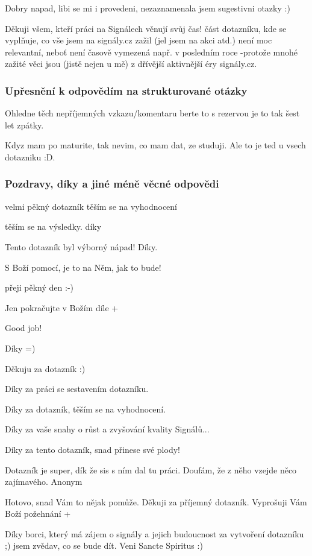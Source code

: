 Dobry napad, libi se mi i provedeni, nezaznamenala jsem sugestivni otazky :)

Děkuji všem, kteří práci na Signálech věnují svůj čas!
část dotazníku, kde se vyplňuje, co vše jsem na signály.cz zažil (jel jsem na akci atd.) není moc relevantní, neboť není časově vymezená např. v posledním roce -protože mnohé zažité věci jsou (jistě nejen u mě) z dřívější aktivnější éry signály.cz.

\subsubsection{Upřesnění k odpovědím na strukturované otázky}

Ohledne těch nepříjemných vzkazu/komentaru berte to s rezervou je to tak šest let zpátky.

Kdyz mam po maturite, tak nevim, co mam dat, ze studuji. Ale to je ted u vsech dotazniku :D.

\subsubsection{Pozdravy, díky a jiné méně věcné odpovědi}

velmi pěkný dotazník těším se na vyhodnocení

těším se na výsledky. díky

Tento dotazník byl výborný nápad! Díky.

S Boží pomocí, je to na Něm, jak to bude!

přeji pěkný den :-)

Jen pokračujte v Božím díle +

Good job!

Díky =)

Děkuju za dotazník :)

Díky za práci se sestavením dotazníku.

Díky za dotazník, těším se na vyhodnocení.

Díky za vaše snahy o růst a zvyšování kvality Signálů...

Díky za tento dotazník, snad přinese své plody!

Dotazník je super, dík že sis s ním dal tu práci. Doufám, že z něho vzejde něco zajímavého. Anonym

Hotovo, snad Vám to nějak pomůže. Děkuji za příjemný dotazník. Vyprošuji Vám Boží požehnání +

Díky borci, který má zájem o signály a jejich budoucnost za vytvoření dotazníku ;) jsem zvědav, co se bude dít. Veni Sancte Spiritus :)

